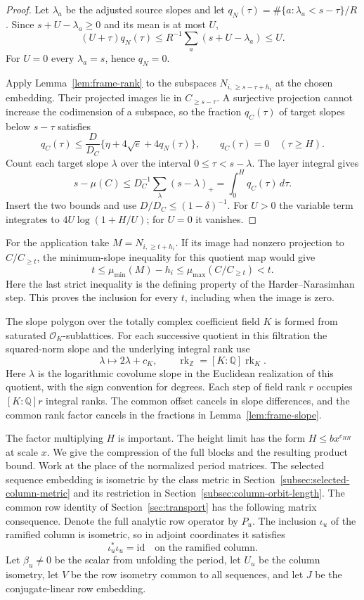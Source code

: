\begin{proof}
Let \(\lambda_a\) be the adjusted source slopes and let
\(q_N(\tau)=\#\{a:\lambda_a<s-\tau\}/R\).
Since \(s+U-\lambda_a\ge0\) and its mean is at most \(U\),
\[
 (U+\tau)q_N(\tau)
 \le R^{-1}\sum_a(s+U-\lambda_a)\le U .
\]
For \(U=0\) every \(\lambda_a=s\), hence \(q_N=0\).

Apply Lemma~\ref{lem:frame-rank} to the subspaces
\(N_{i,\ge s-\tau+h_i}\) at the chosen embedding. Their projected
images lie in \(C_{\ge s-\tau}\). A surjective projection cannot
increase the codimension of a subspace, so the fraction \(q_C(\tau)\)
of target slopes below \(s-\tau\) satisfies
\[
 q_C(\tau)\le \frac{D}{D_C}\{\eta+4\sqrt e+4q_N(\tau)\},
 \qquad q_C(\tau)=0\quad(\tau\ge H).
\]
Count each target slope \(\lambda\) over the interval
\(0\le\tau<s-\lambda\). The layer integral gives
\[
 s-\mu(C)\le D_C^{-1}\sum_\lambda(s-\lambda)_+
 =\int_0^H q_C(\tau)\,d\tau .
\]
Insert the two bounds and use \(D/D_C\le(1-\delta)^{-1}\).
For \(U>0\) the variable term integrates to \(4U\log(1+H/U)\);
for \(U=0\) it vanishes.
\end{proof}

For the application take \(M=N_{i,\ge t+h_i}\). If its image had nonzero projection to \(C/C_{\ge t}\), the minimum-slope inequality for this quotient map would give
\[
  t\le\mu_{\min}(M)-h_i\le
       \mu_{\max}(C/C_{\ge t})<t .
\]
Here the last strict inequality is the defining property of the Harder--Narasimhan step. This proves the inclusion for every \(t\), including when the image is zero.

The slope polygon over the totally complex coefficient field \(K\) is formed from saturated \(\mathcal O_K\)-sublattices. For each successive quotient in this filtration the squared-norm slope and the underlying integral rank use
\[
 \lambda\longmapsto 2\lambda+c_K,\qquad
 \operatorname{rk}_{\mathbb Z}=[K:\mathbb Q]\operatorname{rk}_K .
\]
Here \(\lambda\) is the logarithmic covolume slope in the Euclidean realization of this quotient, with the sign convention for degrees. Each step of field rank \(r\) occupies \([K:\mathbb Q]r\) integral ranks. The common offset cancels in slope differences, and the common rank factor cancels in the fractions in Lemma~\ref{lem:frame-slope}.  \label{cor:frames-1}

The factor multiplying \(H\) is important. The height limit
has the form \(H\le b x^{c_{HH}}\) at scale \(x\).
We give the compression of the full blocks and the resulting
product bound. Work at the place of the normalized period
matrices. The selected sequence embedding is isometric by the class
metric in Section~\ref{subsec:selected-column-metric} and its
restriction in Section~\ref{subsec:column-orbit-length}.
The common row identity of Section~\ref{sec:transport}
has the following matrix consequence. Denote the full analytic row operator by \(P_u\). The inclusion \(\iota_u\) of the ramified column is isometric, so in adjoint coordinates it satisfies
\[
 \iota_u^*\iota_u=\mathrm{id}\quad\text{on the ramified column}.
\] Let \(\beta_u\ne0\) be the
scalar from unfolding the period, let \(U_u\) be the column
isometry, let \(V\) be the row isometry common to all
sequences, and let \(J\) be the conjugate-linear row embedding.

